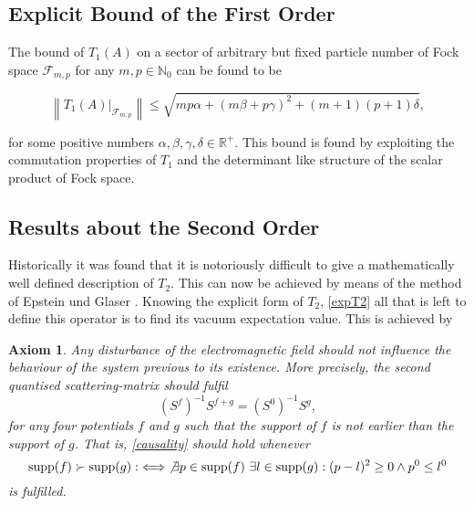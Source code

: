 \documentclass[b5paper,draft,openbib,12pt]{memoir}
\newtheorem{axiom}{Axiom}
\DeclareMathOperator{\supp}{supp}
\begin{document}
\subsection{ Explicit Bound of the First Order}\label{sec: first order}
 The bound of \(T_1(A)\) on a sector of arbitrary but fixed particle number of Fock space \(\mathcal{F}_{m,p}\) for any \(m,p\in\mathbb{N}_0\) can be found to be

\begin{equation}
\left\|  T_1(A)\Big|_{\mathcal{F}_{m,p}}\right\|\le  \sqrt{m p \alpha +(m \beta +p \gamma)^2+(m+1) (p+1) \delta},
\end{equation}
 
 for some positive numbers \(\alpha,\beta,\gamma,\delta \in \mathbb{R}^+\). This bound is found by exploiting the commutation properties of \(T_1\) and the determinant like structure of the scalar product of Fock space.



\subsection{Results about the Second Order}\label{sec: second order}
Historically it was found that it is notoriously difficult to give a mathematically well defined description of \(T_2\). This can now be achieved by means of the method of Epstein und Glaser \cite{epstein1973role}. Knowing the explicit form of \(T_2\),
 \eqref{expT2} all that is left to define this operator is to find its vacuum expectation value. 
This is achieved by
\begin{axiom}\label{ax:causality} Any disturbance of the electromagnetic field should not influence the behaviour of the system previous to its existence. More precisely, the second quantised scattering-matrix should fulfil
\begin{equation}\label{causality}
\left( S^f \right)^{-1} S^{f+g}= \left( S^0 \right)^{-1} S^{g}\tag{causality},
\end{equation}
 for any four potentials \(f\) and \(g\) such that the support of \(f\) is not earlier than the support of \(g\). That is, \eqref{causality} should hold whenever
 \begin{equation}\label{f>g}
 \supp (f) \succ \supp (g) :\iff  \not\exists p\in\supp (f)  \text{ } \exists l\in \supp (g): (p-l)^2 \ge 0 \wedge p^0 \le l^0
 \end{equation}
is fulfilled.
\end{axiom}
\end{document}
